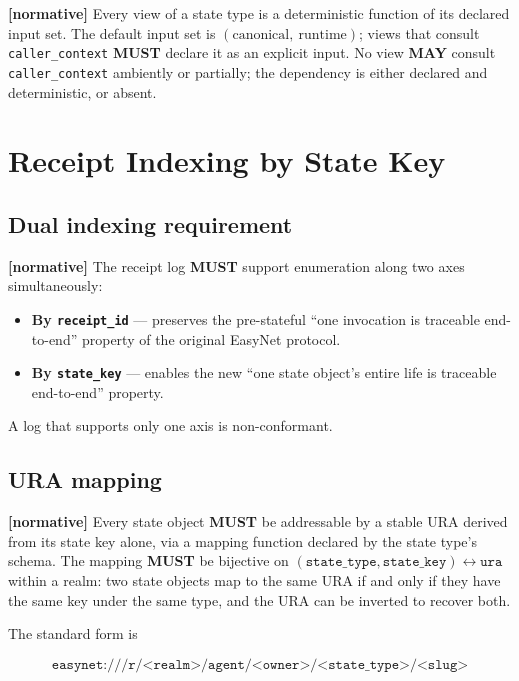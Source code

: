 \documentclass[11pt,a4paper]{article}
\newcommand{\normsv}{\textcolor{normativecolor}{\textbf{[normative]}}\xspace}
\theoremstyle{definition}
\begin{document}
\normsv{}
Every view of a state type is a deterministic function of its
declared input set. The default input set is
$(\text{canonical},\ \text{runtime})$; views that consult
\texttt{caller\_context} \textbf{MUST} declare it as an explicit
input. No view \textbf{MAY} consult \texttt{caller\_context}
ambiently or partially; the dependency is either declared and
deterministic, or absent.

\section{Receipt Indexing by State Key}
\label{sec:receipt-index}

\subsection{Dual indexing requirement}

\normsv{}
The receipt log \textbf{MUST} support enumeration along two axes
simultaneously:

\begin{itemize}[leftmargin=2em,itemsep=0.25em]
    \item \textbf{By \texttt{receipt\_id}} --- preserves the
    pre-stateful ``one invocation is traceable end-to-end''
    property of the original EasyNet protocol.
    \item \textbf{By \texttt{state\_key}} --- enables the new
    ``one state object's entire life is traceable end-to-end''
    property.
\end{itemize}

A log that supports only one axis is non-conformant.

\subsection{URA mapping}

\normsv{}
Every state object \textbf{MUST} be addressable by a stable
URA derived from its state key alone, via a mapping function
declared by the state type's schema. The mapping
\textbf{MUST} be bijective on $(\texttt{state\_type},
\texttt{state\_key}) \leftrightarrow \texttt{ura}$ within a realm:
two state objects map to the same URA if and only if they have
the same key under the same type, and the URA can be inverted to
recover both.

The standard form is

\[
    \texttt{easynet:///r/<realm>/agent/<owner>/<state\_type>/<slug>}
\]
\end{document}
